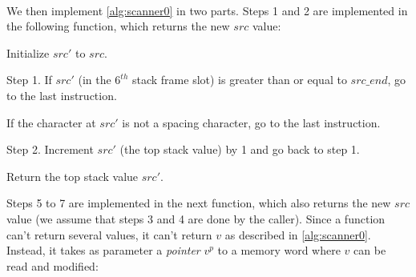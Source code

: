 \begin{TwoColumns}
\\
\end{TwoColumns}

We then implement \cref{alg:scanner0} in two parts. Steps 1 and 2 are
implemented in the following function, which returns the new $src$ value:

\begin{Paragraph}
\begin{paracol}{2}

Initialize $src'$ to $src$.


Step 1. If $src'$ (in the $6^{th}$ stack frame slot) is greater than or equal to
$src\_end$, go to the last instruction.


If the character at $src'$ is not a spacing character, go to the last
instruction.


Step 2. Increment $src'$ (the top stack value) by 1 and go back to step 1.


Return the top stack value $src'$.

\end{paracol}
\end{Paragraph}

Steps 5 to 7 are implemented in the next function, which also returns the new
$src$ value (we assume that steps 3 and 4 are done by the caller). Since a
function can't return several values, it can't return $v$ as described in
\cref{alg:scanner0}. Instead, it takes as parameter a {\em pointer} $v^p$ to a
memory word where $v$ can be read and modified:

